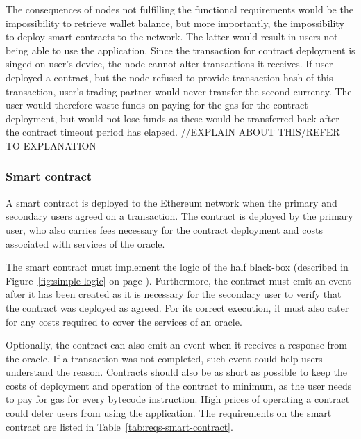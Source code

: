 The consequences of nodes not fulfilling the functional requirements would be the impossibility to retrieve wallet balance, but more importantly, the impossibility to deploy smart contracts to the network. The latter would result in users not being able to use the application. Since the transaction for contract deployment is singed on user’s device, the node cannot alter transactions it receives. If user deployed a contract, but the node refused to provide transaction hash of this transaction, user’s trading partner would never transfer the second currency. The user would therefore waste funds on paying for the gas for the contract deployment, but would not lose funds as these would be transferred back after the contract timeout period has elapsed. //EXPLAIN ABOUT THIS/REFER TO EXPLANATION

\subsubsection{Smart contract}
A smart contract is deployed to the Ethereum network when the primary and secondary users agreed on a transaction. The contract is deployed by the primary user, who also carries fees necessary for the contract deployment and costs associated with services of the oracle\footnotemark.
% 

The smart contract must implement the logic of the half black-box (described in Figure~\ref{fig:simple-logic} on page \pageref{fig:simple-logic}). Furthermore, the contract must emit an event after it has been created as it is necessary for the secondary user to verify that the contract was deployed as agreed. For its correct execution, it must also cater for any costs required to cover the services of an oracle.

Optionally, the contract can also emit an event when it receives a response from the oracle. If a transaction was not completed, such event could help users understand the reason. Contracts should also be as short as possible to keep the costs of deployment and operation of the contract to minimum, as the user needs to pay for gas for every bytecode instruction. High prices of operating a contract could deter users from using the application. The requirements on the smart contract are listed in Table~\ref{tab:reqs-smart-contract}.

